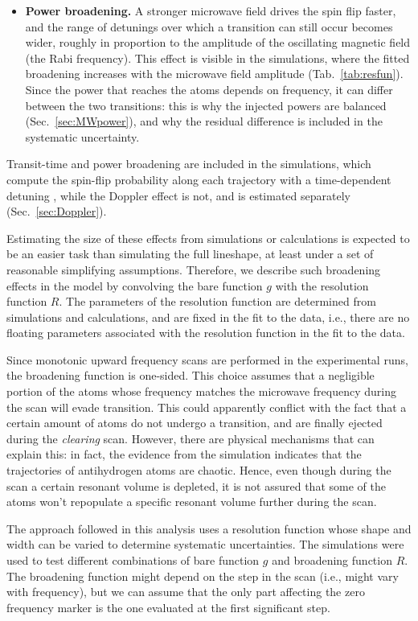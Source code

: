 \begin{itemize}
    \item \textbf{Power broadening.} A stronger microwave field drives the spin flip faster, and the range of detunings over which a transition can still occur becomes wider, roughly in proportion to the amplitude of the oscillating magnetic field (the Rabi frequency). This effect is visible in the simulations, where the fitted broadening increases with the microwave field amplitude (Tab.~\ref{tab:resfun}). Since the power that reaches the atoms depends on frequency, it can differ between the two transitions: this is why the injected powers are balanced (Sec.~\ref{sec:MWpower}), and why the residual difference is included in the systematic uncertainty.
\end{itemize}

Transit-time and power broadening are included in the simulations, which compute the spin-flip probability along each trajectory with a time-dependent detuning \cite{ALPHA:2026lbu}, while the Doppler effect is not, and is estimated separately (Sec.~\ref{sec:Doppler}).

Estimating the size of these effects from simulations or calculations is expected to be an easier task than simulating the full lineshape, at least under a set of reasonable simplifying assumptions. Therefore, we describe such broadening effects in the model by convolving the bare function $g$ with the resolution function $R$. The parameters of the resolution function are determined from simulations and calculations, and are fixed in the fit to the \Hbar data, i.e., there are no floating parameters associated with the resolution function in the fit to the data.

Since monotonic upward frequency scans are performed in the experimental runs, the broadening function is one-sided. This choice assumes that a negligible portion of the atoms whose frequency matches the microwave frequency during the scan will evade transition. This could apparently conflict with the fact that a certain amount of atoms do not undergo a transition, and are finally ejected during the \textit{clearing} scan. However, there are physical mechanisms that can explain this: in fact, the evidence from the simulation indicates that the trajectories of antihydrogen atoms are chaotic. Hence, even though during the scan a certain resonant volume is depleted, it is not assured that some of the atoms won't repopulate a specific resonant volume further during the scan.

The approach followed in this analysis uses a resolution function whose shape and width can be varied to determine systematic uncertainties. The simulations were used to test different combinations of bare function $g$ and broadening function $R$.
The broadening function might depend on the step in the scan (i.e., might vary with frequency), but we can assume that the only part affecting the zero frequency marker is the one evaluated at the first significant step. 

